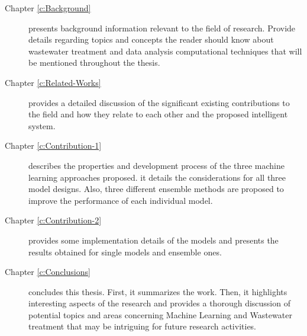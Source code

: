 \begin{description}

  \item[Chapter \ref{c:Background}] presents background information relevant to the field of research. Provide details regarding topics and concepts the reader should know about wastewater treatment and data analysis computational techniques that will be mentioned throughout the thesis.
  
  \item[Chapter \ref{c:Related-Works}] provides a detailed discussion of the significant existing contributions to the field and how they relate to each other and the proposed intelligent system.
  
  \item[Chapter \ref{c:Contribution-1}] describes the properties and development process of the three machine learning approaches proposed. it details the considerations for all three model designs. Also, three different ensemble methods are proposed to improve the performance of each individual model.
  
  \item[Chapter \ref{c:Contribution-2}] provides some implementation details of the models and presents the results obtained for single models and ensemble ones. 
  
  
  \item[Chapter \ref{c:Conclusions}] concludes this thesis. First, it summarizes the work. Then, it highlights interesting aspects of the research and provides a thorough discussion of potential topics and areas concerning Machine Learning and Wastewater treatment that may be intriguing for future research activities. 
  
\end{description}



